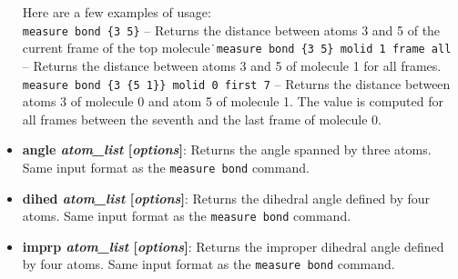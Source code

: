 \begin{itemize}
  Here are a few examples of usage:\\
  {\tt measure bond \{3 5\}} -- Returns the distance between atoms 3 and 5 of the
  current frame of the top molecule\.\
  {\tt measure bond \{3 5\} molid 1 frame all} -- Returns the distance between
  atoms 3 and 5 of molecule 1 for all frames.\\
  {\tt measure bond \{3 \{5 1\}\} molid 0 first 7} -- Returns the distance between
  atoms 3 of molecule 0 and atom 5 of molecule 1. The value is computed for all
  frames between the seventh and the last frame of molecule 0.
  
\item {\bf angle {\it atom\_list} [{\it options}]}:
  Returns the angle spanned by three atoms. Same input format as the
  {\tt measure bond} command.

\item {\bf dihed {\it atom\_list} [{\it options}]}:
  Returns the dihedral angle defined by four atoms. Same input format as the
  {\tt measure bond} command.

\item {\bf imprp {\it atom\_list} [{\it options}]}:
  Returns the improper dihedral angle defined by four atoms. Same input format as the
  {\tt measure bond} command.


\end{itemize}
